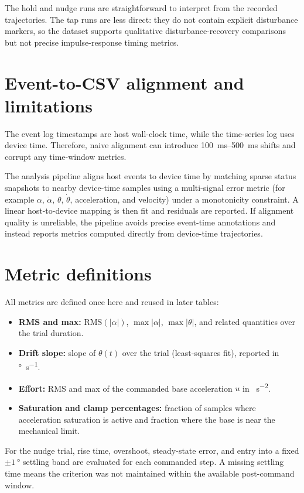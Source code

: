 The hold and nudge runs are straightforward to interpret from the recorded trajectories. The tap runs are less direct: they do not contain explicit disturbance markers, so the dataset supports qualitative disturbance-recovery comparisons but not precise impulse-response timing metrics.

\section{Event-to-CSV alignment and limitations}
The event log timestamps are host wall-clock time, while the time-series log uses device time. Therefore, naive alignment can introduce \SIrange{100}{500}{ms} shifts and corrupt any time-window metrics.

The analysis pipeline aligns host events to device time by matching sparse status snapshots to nearby device-time samples using a multi-signal error metric (for example $\alpha$, $\dot{\alpha}$, $\theta$, $\dot{\theta}$, acceleration, and velocity) under a monotonicity constraint. A linear host-to-device mapping is then fit and residuals are reported. If alignment quality is unreliable, the pipeline avoids precise event-time annotations and instead reports metrics computed directly from device-time trajectories.

\section{Metric definitions}
All metrics are defined once here and reused in later tables:
\begin{itemize}
  \item \textbf{RMS and max:} $\mathrm{RMS}(|\alpha|)$, $\max|\alpha|$, $\max|\theta|$, and related quantities over the trial duration.
  \item \textbf{Drift slope:} slope of $\theta(t)$ over the trial (least-squares fit), reported in \si{\degree\per\second}.
  \item \textbf{Effort:} RMS and max of the commanded base acceleration $u$ in \si{\step\per\second\squared}.
  \item \textbf{Saturation and clamp percentages:} fraction of samples where acceleration saturation is active and fraction where the base is near the mechanical limit.
\end{itemize}

For the nudge trial, rise time, overshoot, steady-state error, and entry into a
fixed $\pm\SI{1}{\degree}$ settling band are evaluated for each commanded
step. A missing settling time means the criterion was not maintained within
the available post-command window.

